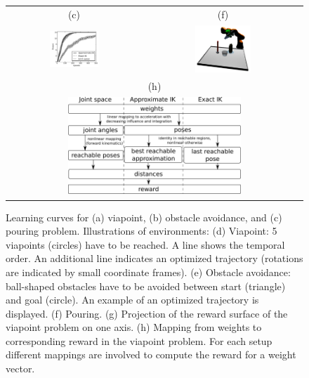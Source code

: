 \documentclass{svproc}
\begin{document}
\begin{figure}
\begin{tabular}{ccc}
(c)&\multicolumn{2}{c}{(f)}\\
\includegraphics[width=0.38\textwidth]{result_comparison_pouring}&
\multicolumn{2}{c}{
\includegraphics[width=0.37\textwidth]{pouring}}\\
\multicolumn{3}{c}{(h)}\\
\multicolumn{3}{c}{\includegraphics[width=0.6\textwidth]{mapping}}
\end{tabular}
\centering
\caption{
Learning curves for (a) viapoint, (b) obstacle avoidance, and (c) pouring problem.
Illustrations of environments:
(d) Viapoint: 5 viapoints (circles) have to be reached. A line shows the temporal order.
An additional line indicates an optimized trajectory (rotations are
indicated by small coordinate frames).
(e) Obstacle avoidance: ball-shaped obstacles have to be avoided between start (triangle)
and goal (circle). An example of an optimized trajectory is displayed.
(f) Pouring.
(g) Projection of the reward surface of the viapoint problem on one axis.
(h) Mapping from weights to corresponding reward in the viapoint problem.
For each setup different mappings are involved to compute the reward for
a weight vector.
}
\label{fig:results}
\end{figure}
\end{document}

